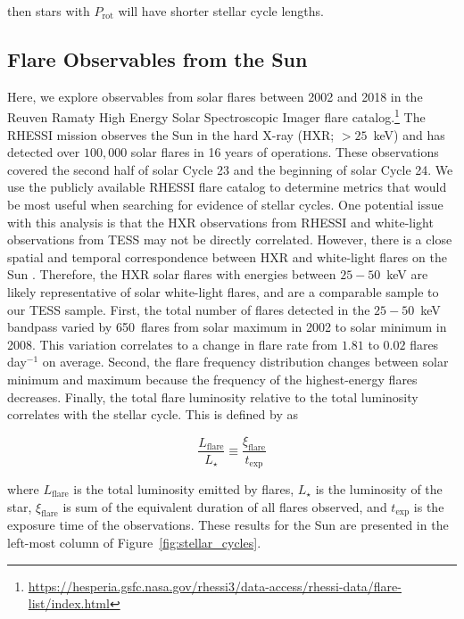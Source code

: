 \documentclass[twocolumn, linenumbers]{aastex631}
\begin{document}
then stars with $P_\textrm{rot}$ will have shorter stellar cycle lengths.


\subsection{Flare Observables from the Sun}

Here, we explore observables from solar flares between 2002 and 2018 in the Reuven Ramaty High Energy Solar Spectroscopic Imager \citep[RHESSI;][]{lin02} flare
catalog.\footnote{\url{https://hesperia.gsfc.nasa.gov/rhessi3/data-access/rhessi-data/flare-list/index.html}} The RHESSI mission observes the Sun in the hard X-ray
(HXR; $> 25$~keV) and has detected over $100,000$ solar flares in 16 years of operations. These observations covered the second half of solar Cycle 23 and the beginning of
solar Cycle 24. We use the publicly available RHESSI flare catalog to determine  metrics that would be most useful when searching for evidence of stellar cycles. One potential
issue with this analysis is that the HXR observations from RHESSI and white-light observations from TESS may not be directly correlated. However, there is a close spatial and
temporal correspondence between HXR and white-light flares on the Sun \citep{fletcher07, krucker11, kleint16}. Therefore, the HXR solar flares with energies between $25 - 50$~keV
are likely representative of solar white-light flares, and are a comparable sample to our TESS sample. First, the total number of flares detected in the $25 - 50$~keV bandpass
varied by 650~flares from solar maximum in 2002 to solar minimum in 2008. This variation correlates to a change in flare rate from $1.81$ to $0.02$ flares day$^{-1}$ on average.
Second, the flare frequency distribution changes between solar minimum and maximum because the frequency of the highest-energy flares decreases.  Finally, the total flare luminosity
relative to the total luminosity correlates with the stellar cycle. This is defined by \cite{lurie15} as

\begin{equation}
    \frac{L_\textrm{flare}}{L_\star} \equiv \frac{\xi_\textrm{flare}}{t_\textrm{exp}}
\end{equation}

where $L_\textrm{flare}$ is the total luminosity emitted by flares, $L_\star$ is the luminosity of the star, $\xi_\textrm{flare}$ is sum of the equivalent duration of all flares
observed, and $t_\textrm{exp}$ is the exposure time of the observations. These results for the Sun are presented in the left-most column of Figure~\ref{fig:stellar_cycles}.
\end{document}
